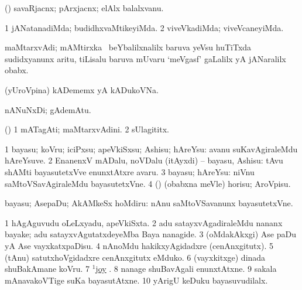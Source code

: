 \bentry
{}
\gl{\nA}
\bmng
(\AmA) savaRjacnx; pArxjacnx; elAlx balalxvanu. 
\emng
\eentry

\bentry
{}
\gl{\kirxvi}
\bmng
\bnum
\num{1} jANatanadiMda; budidhxvaMtikeyiMda. 
\num{2} viveVkadiMda; viveVcaneyiMda. 
\enum
\emng
\eentry

\bentry
{}
\gl{\nA}
\bmng
maMtarxvAdi; mAMtirxka \eng{[} \kanmu\ beYbalilxnalilx baruva yeVsu huTiTxda sudidxyanunx aritu, tiLisalu baruva mUvaru `meVgasf' gaLalilx yA jANaralilx obabx\eng{]}. 
\emng
\eentry

\bentry
{}
\gl{\nA}
\bmng
(yUroVpina) kADememx yA kADukoVNa. 
\emng
\eentry

\bentry
{}
\gl{\nA}
\bmng
nANuNxDi; gAdemAtu. 
\emng
\eentry

\bentry
{}
\gl{\nA}
\bmng
(\birx) 
\bnum
\num{1} mATagAti; maMtarxvAdini. 
\num{2} sUlagititx. 
\enum
\emng
\eentry

\bentry
{} 
\gl{\sakirx}
\bmng
\bnum
\num{1} bayasu; koVru; iciPxsu; apeVkiSxsu; Ashisu; hAreYsu:  avanu suKavAgiraleMdu hAreYsuve. 
\num{2} EnanenxV mADalu, noVDalu (itAyxdi) -- bayasu, Ashisu:  tAvu shAMti bayasutetxVve enunxtAtxre avaru. 
\num{3} bayasu; hAreYsu:  niVnu saMtoVSavAgiraleMdu bayasutetxVne. 
\num{4} (\AmA) (obabxna meVle) horisu; AroVpisu. 
\enum
\emng

\noindent 
\gl{\akirx}
\bmng
bayasu; AsepaDu; AkAMkeSx hoMdiru:  nAnu saMtoVSavanunx bayasutetxVne. 
\emng

\noindent 
\gl{\pagu}
\bmng
\bnum
\num{1}  hAgAguvudu oLeLxyadu, apeVkiSxta. 
\num{2}  adu satayxvAgadiraleMdu nananx bayake; adu satayxvAgutatxdeyeMba Baya nanagide. 
\num{3}  (oMdakAkxgi) Ase paDu yA Ase vayxkatxpaDisu. 
\num{4}  nAnoMdu hakikxyAgidadxre (cenAnxgitutx). 
\num{5}  (tAnu) satutxhoVgidadxre cenAnxgitutx eMduko. 
\num{6}  (vayxkitxge) dinada shuBakAmane koVru. 
\num{7}  \hyperref{kandict_j.pdf}{J}{joy(1) nuga}{$^1$joy} . 
\num{8}  nanage shuBavAgali enunxtAtxne. 
\num{9}  sakala mAnavakoVTige suKa bayasutAtxne. 
\num{10}  yArigU keDuku bayasuvudilalx. 
\enum
\emng
\eentry

